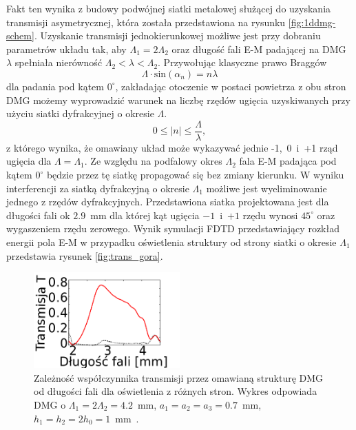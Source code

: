 Fakt ten wynika z budowy podwójnej siatki metalowej służącej do uzyskania transmisji asymetrycznej, która została przedstawiona na rysunku \ref{fig:1ddmg-schem}. Uzyskanie transmisji jednokierunkowej możliwe jest przy dobraniu parametrów układu tak, aby $\Lambda_1 = 2\Lambda_2$ oraz długość fali E-M padającej na DMG  $\lambda$ spełniała nierówność $\Lambda_2<\lambda<\Lambda_2$. Przywołując klasyczne prawo Braggów
\begin{equation}
	\Lambda \cdot \textrm{sin}(\alpha_n) = n \lambda 
\end{equation}
dla padania pod kątem $0^{\circ}$, zakładając otoczenie w postaci powietrza z obu stron DMG możemy wyprowadzić warunek na liczbę rzędów ugięcia uzyskiwanych przy użyciu siatki dyfrakcyjnej o okresie $\Lambda$. 
\begin{equation}
	 0 \le |n| \le \frac { \Lambda }{\lambda},
\end{equation}
z którego wynika, że omawiany układ może wykazywać jednie -1,~0~i~+1 rząd ugięcia dla  $\Lambda=\Lambda_1$. Ze względu na podfalowy okres $\Lambda_2$ fala E-M padająca pod kątem $0^{\circ}$ będzie przez tę siatkę propagować się bez zmiany kierunku.  W wyniku interferencji za siatką dyfrakcyjną o okresie $\Lambda_1$ możliwe jest wyeliminowanie jednego z rzędów dyfrakcyjnych. Przedstawiona siatka projektowana jest dla długości fali ok $2.9$~mm dla której kąt ugięcia $-1$~i~$+1$ rzędu wynosi $45^{\circ}$ oraz wygaszeniem rzędu zerowego. Wynik symulacji FDTD przedstawiający rozkład energii pola E-M w przypadku oświetlenia struktury od strony siatki o okresie $\Lambda_1$ przedstawia rysunek \ref{fig:trans_gora}.

\begin{figure}[tb]
	\centering
	\includegraphics[width=0.5\textwidth]{images/thz/opt_lett_spect.png}
	\caption{Zależność współczynnika transmisji przez omawianą strukturę DMG od długości fali dla oświetlenia z różnych stron. Wykres odpowiada DMG o $\Lambda_1= 2 \Lambda_2 = 4.2$~mm, $a_1=a_2=a_3=0.7$~mm, $h_1=h_2=2 h_0=1$~mm~\cite{Stolarek:13}.}
	\label{fig:trans_freq}
\end{figure}

